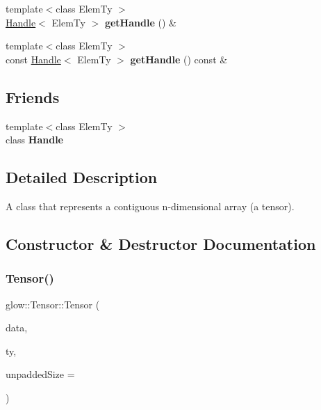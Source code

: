 \begin{DoxyCompactItemize}
\mbox{\label{classglow_1_1_tensor_a3145589191c1d1a4fd79f5c2f1215860}} 
{\footnotesize template$<$class Elem\+Ty $>$ }\\\hyperlink{classglow_1_1_handle}{Handle}$<$ Elem\+Ty $>$ {\bfseries get\+Handle} () \&
\item 
\mbox{\label{classglow_1_1_tensor_acbd750d3ec78725e4629479519430807}} 
{\footnotesize template$<$class Elem\+Ty $>$ }\\const \hyperlink{classglow_1_1_handle}{Handle}$<$ Elem\+Ty $>$ {\bfseries get\+Handle} () const \&
\end{DoxyCompactItemize}
\subsection*{Friends}
\begin{DoxyCompactItemize}
\item 
\mbox{\label{classglow_1_1_tensor_a67ca1a2d91273eaf85fb3d23ba8ce984}} 
{\footnotesize template$<$class Elem\+Ty $>$ }\\class {\bfseries Handle}
\end{DoxyCompactItemize}


\subsection{Detailed Description}
A class that represents a contiguous n-\/dimensional array (a tensor). 

\subsection{Constructor \& Destructor Documentation}
\mbox{\label{classglow_1_1_tensor_a647b7d8c649846c034297a04d4c3680b}} 
\subsubsection{\texorpdfstring{Tensor()}{Tensor()}}
{\footnotesize\ttfamily glow\+::\+Tensor\+::\+Tensor (\begin{DoxyParamCaption}\item[{void $\ast$}]{data,  }\item[{\hyperlink{structglow_1_1_type}{Type\+Ref}}]{ty,  }\item[{size\+\_\+t}]{unpadded\+Size = {} }\end{DoxyParamCaption})\hspace{0.3cm}{\ttfamily [inline]}}

